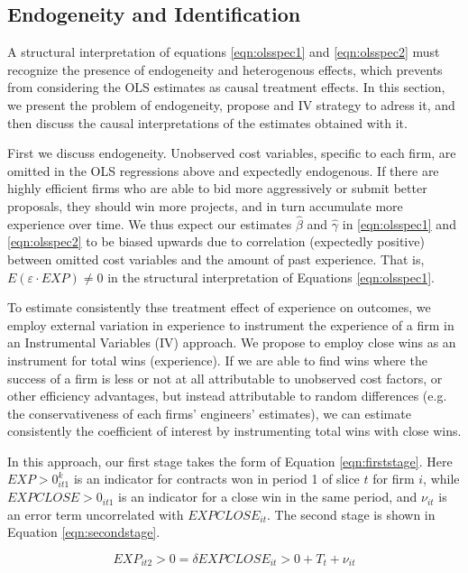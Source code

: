 \subsection{Endogeneity and Identification}
A structural interpretation of equations \ref{eqn:olsspec1} and \ref{eqn:olsspec2} must recognize the presence of endogeneity and heterogenous effects, which prevents from considering the OLS estimates as causal treatment effects. In this section, we present the problem of endogeneity, propose and IV strategy to adress it, and then discuss the causal interpretations of the estimates obtained with it.

First we discuss endogeneity. Unobserved cost variables, specific to each firm, are omitted in the OLS regressions above and expectedly endogenous. If there are highly efficient firms who are able to bid more aggressively or submit better proposals, they should win more projects, and in turn accumulate more experience over time. We thus expect our estimates $\hat{\beta}$ and $\hat{\gamma}$ in \ref{eqn:olsspec1} and \ref{eqn:olsspec2} to be biased upwards due to correlation (expectedly positive) between omitted cost variables and the amount of past experience. That is, $E(\varepsilon \cdot EXP)\neq 0$ in the structural interpretation of Equations \ref{eqn:olsspec1}.

To estimate consistently thse treatment effect of experience on outcomes, we employ external variation in experience to instrument the experience of a firm in an Instrumental Variables (IV) approach. We propose to employ close wins as an instrument for total wins (experience). If we are able to find wins where the success of a firm is less or not at all attributable to unobserved cost factors, or other efficiency advantages, but instead attributable to random differences (e.g. the conservativeness of each firms' engineers' estimates), we can estimate consistently the coefficient of interest by instrumenting total wins with close wins.

In this approach, our first stage takes the form of Equation \ref{eqn:firststage}. Here $EXP>0_{it1}^k$ is an indicator for contracts won in period 1 of slice $t$ for firm $i$, while $EXPCLOSE>0_{it1}$ is an indicator for a close win in the same period, and $\nu_{it}$ is an error term uncorrelated with $EXPCLOSE_{it}$. The second stage is shown in Equation \ref{eqn:secondstage}.

\begin{equation}
\label{eqn:firststage}
EXP_{it2}>0= \delta EXPCLOSE_{it}>0+T_t+\nu_{it}
\end{equation}

